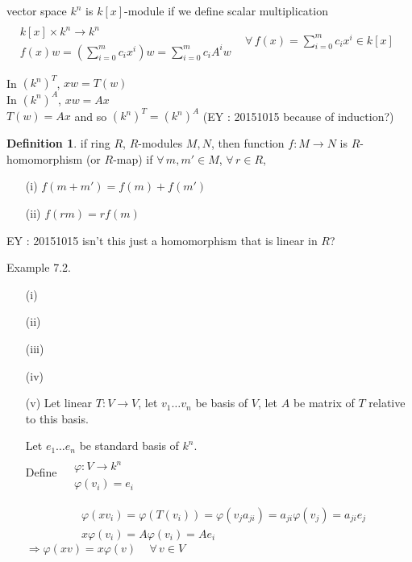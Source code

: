 \documentclass[twoside,landscape]{amsart}
\theoremstyle{plain}
\theoremstyle{definition}
\newtheorem{definition}{Definition}
\theoremstyle{remark}
\begin{document}
\begin{multicols*}{2}
\begin{enumerate}
vector space $k^n$ is $k[x]$-module if we define scalar multiplication $\begin{aligned} & \quad \\
  & k[x] \times k^n \to k^n \\
  & f(x)w = \left( \sum_{i=0}^m c_ix^i \right)w = \sum_{i=0}^m c_i A^i w \end{aligned}$ \quad \, $\forall \, f(x) = \sum_{i=0}^m c_ix^i \in k[x]$

In $(k^n)^T$, $xw = T(w)$ \\
In $(k^n)^A$, $xw = Ax $ \\
$T(w) = Ax$ and so $(k^n)^T = (k^n)^A$  (EY : 20151015 because of induction?)
\end{enumerate}

\begin{definition}
if ring $R$, $R$-modules $M,N$, then function $f:M\to N$ is $R$-homomorphism (or $R$-map) if $\forall \, m,m' \in M$, $\forall \, r \in R$, 
\begin{enumerate}
  \item[(i)] $f(m+m') = f(m)+f(m')$
  \item[(ii)] $f(rm)=rf(m)$
\end{enumerate}
\end{definition}
EY : 20151015 isn't this just a homomorphism that is linear in $R$? 

Example 7.2.  

\begin{enumerate}
  \item[(i)]
  \item[(ii)]
  \item[(iii)]
  \item[(iv)]
  \item[(v)] Let linear $T:V \to V$, let $v_1 \dots v_n$ be basis of $V$, let $A$ be matrix of $T$ relative to this basis.  

Let $e_1 \dots e_n$ be standard basis of $k^n$.  \\
Define $\begin{aligned} & \quad \\
  & \varphi : V \to k^n \\
  & \varphi(v_i) = e_i \end{aligned}$

\[
\begin{aligned}
  & \varphi(xv_i) = \varphi(T(v_i)) = \varphi(v_j a_{ji} ) = a_{ji} \varphi(v_j) = a_{ji}e_j \\
  & x\varphi(v_i) = A\varphi(v_i) = Ae_i
\end{aligned}
\]
$\Longrightarrow \varphi(xv) = x\varphi(v) \quad \, \forall \, v \in V$


\end{enumerate}
\end{multicols*}
\end{document}
